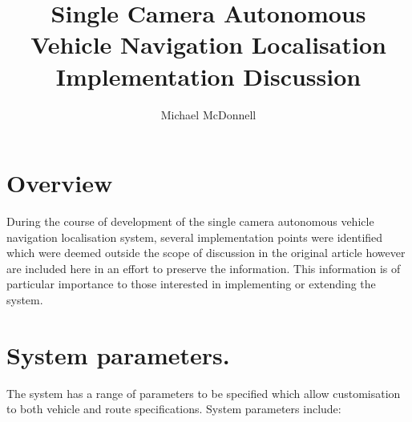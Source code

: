 \documentclass{article}
\begin{document}
	
\title{Single Camera Autonomous Vehicle Navigation Localisation Implementation Discussion}
\author{Michael McDonnell}
\date{}
\maketitle

\section{Overview}
During the course of development of the single camera autonomous vehicle navigation localisation system, several implementation points were identified which were deemed outside the scope of discussion in the original article however are included here in an effort to preserve the information. This information is of particular importance to those interested in implementing or extending the system.


\section{System parameters.} The system has a range of parameters to be specified which allow customisation to both vehicle and route specifications. System parameters include: 
\end{document}
